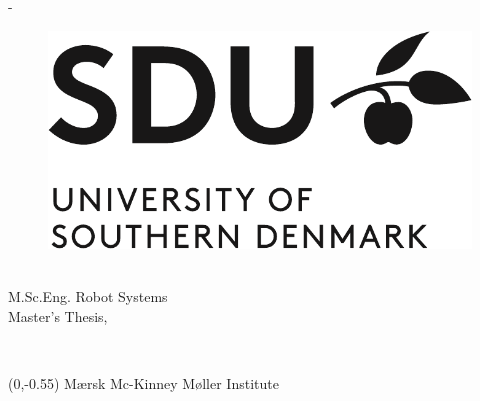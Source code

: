 \begin{titlingpage}
	\thispagestyle{empty}
	\enlargethispage{1.3cm}
	\calccentering{\unitlength}
	\begin{adjustwidth}{\unitlength}{-\unitlength}
		\vspace*{-1.9cm}
		\begin{figure} %
			\centering
			\includegraphics[width=.75\textwidth]{figures/front_matter/sdu_logo_uk-crop}
		\end{figure}

		\begin{centering}
			\begin{Spacing}{1.2}
				{\sffamily\HUGE\textbf{\ThTitleEN}\\[1cm]}
				{\sffamily\LARGE{M.Sc.Eng.  Robot Systems}\\[1cm]}
				{\sffamily\LARGE{Master's Thesis, \ThEndDate}\\[1cm]}
			\end{Spacing}
			{\LARGE\sffamily\ThAuthors\\[2cm]}
		\end{centering}
		\begin{raggedright}
            \begin{textblock}{6.5}(0,-0.55)
    			\sffamily\LARGE{Mærsk Mc-Kinney Møller Institute}
            \end{textblock}
		\end{raggedright}
	\end{adjustwidth}


\end{titlingpage}
